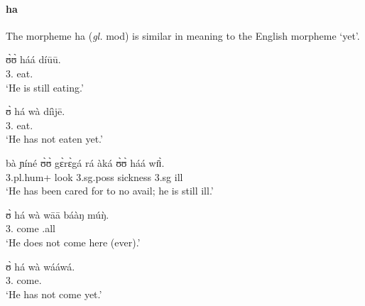 \begin{exe}
\begin{exe}
\begin{exe}
{\begin{exe}
\begin{exe}
\begin{exe}
\begin{exe}
\begin{exe}
\begin{exe}
\begin{exe}
\begin{exe}
\begin{exe}
\begin{exe}
\begin{exe}
\begin{exe}
\begin{exe}
\begin{exe}
\begin{exe}
\begin{exe}
\begin{exe}
\begin{exe}
\begin{exe}
\begin{exe}
\begin{exe}
\paragraph{ha}
\label{sec:GRM-preverb-yet}

The morpheme {\sls ha} ({\it gl.} {\sc mod}) is similar in meaning to the 
English 
morpheme `yet'. 

% 


\ea
\ea\label{ex:vp32.24}
\gll ʊ̀ʊ̀ háá díūū.\\
  {3.\sg}  {\mod} eat.\foc\\
\glt  `He is still eating.' 


\ex\label{ex:vp20.3.2.}
\gll ʊ̀ há wà díìjē.\\
 {3.\sg}  {\mod} {\neg} eat.{\pfv}\\
\glt  `He has not eaten yet.'


\ex\label{ex:vp21.2.1.}
\gll bà ɲíné ʊ̀ʊ̀ gɛ̀rɛ̀gá rá àká ʊ̀ʊ̀ háá wɪ̄ɪ̀.\\
 {\sc 3.pl.hum+} look {\sc 3.sg.poss} sickness {\foc} {\conn}  {\sc 3.sg}
{\mod} ill\\
\glt  `He has been cared for to no avail; he is still ill.' 


\ex\label{ex:vp20.1.1.}
\gll ʊ̀ há  wà wāā báàŋ múŋ̀.\\
    {3.\sg} {\mod}  {\neg} come {\dem} {\quant}.all\\
\glt  `He does not come here (ever).' 


\ex\label{ex:vp20.3.1.}
\gll ʊ̀ há wà wááwá.\\
    {3.\sg} {\mod}   {\neg} come.{\pfv}\\
\glt  `He has not come yet.' 


\z 
 \z
 

\end{exe}
\end{exe}
\end{exe}
\end{exe}
\end{exe}
\end{exe}
\end{exe}
\end{exe}
\end{exe}
\end{exe}
\end{exe}
\end{exe}
\end{exe}
\end{exe}
\end{exe}
\end{exe}
\end{exe}
\end{exe}
\end{exe}
\end{exe}
\end{exe}}
\end{exe}
\end{exe}
\end{exe}

